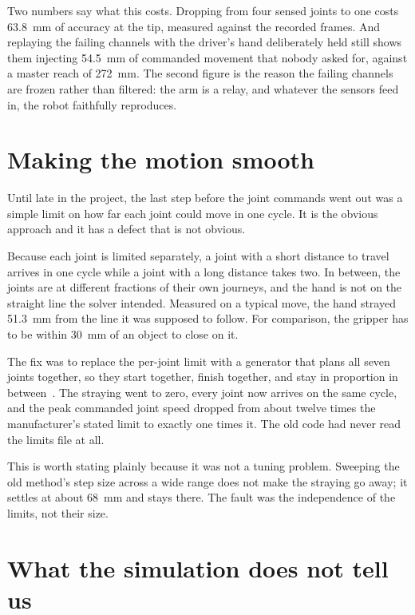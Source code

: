 Two numbers say what this costs. Dropping from four sensed joints to one costs
\SI{63.8}{\milli\metre} of accuracy at the tip, measured against the recorded
frames. And replaying the failing channels with the driver's hand deliberately
held still shows them injecting \SI{54.5}{\milli\metre} of commanded movement
that nobody asked for, against a master reach of \SI{272}{\milli\metre}. The
second figure is the reason the failing channels are frozen rather than
filtered: the arm is a relay, and whatever the sensors feed in, the robot
faithfully reproduces.

\section{Making the motion smooth}

Until late in the project, the last step before the joint commands went out
was a simple limit on how far each joint could move in one cycle. It is the
obvious approach and it has a defect that is not obvious.

Because each joint is limited separately, a joint with a short distance to
travel arrives in one cycle while a joint with a long distance takes two. In
between, the joints are at different fractions of their own journeys, and the
hand is not on the straight line the solver intended. Measured on a typical
move, the hand strayed \SI{51.3}{\milli\metre} from the line it was supposed
to follow. For comparison, the gripper has to be within \SI{30}{\milli\metre}
of an object to close on it.

The fix was to replace the per-joint limit with a generator that plans all
seven joints together, so they start together, finish together, and stay in
proportion in between~\cite{berscheid2021ruckig}. The straying went to zero,
every joint now arrives on the same cycle, and the peak commanded joint speed
dropped from about twelve times the manufacturer's stated limit to exactly
one times it. The old code had never read the limits file at all.

This is worth stating plainly because it was not a tuning problem. Sweeping
the old method's step size across a wide range does not make the straying go
away; it settles at about \SI{68}{\milli\metre} and stays there. The fault was
the independence of the limits, not their size.

\section{What the simulation does not tell us}

